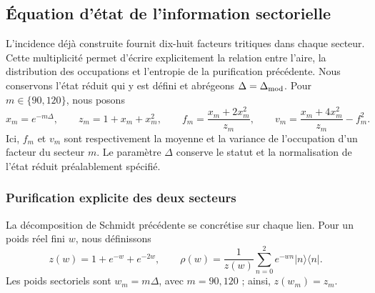 \subsection{Équation d'état de l'information sectorielle}
\label{sec:ii-ecuacion-informacion}

L'incidence déjà construite fournit dix-huit facteurs tritiques dans
chaque secteur. Cette multiplicité permet d'écrire explicitement la
relation entre l'aire, la distribution des occupations et l'entropie de
la purification précédente. Nous conservons l'état réduit qui y est défini
et abrégeons $\Delta=\Delta_{\rm mod}$. Pour $m\in\{90,120\}$, nous posons
\begin{equation}
 x_m=e^{-m\Delta},\qquad z_m=1+x_m+x_m^2,\qquad
 f_m=\frac{x_m+2x_m^2}{z_m},\qquad
 v_m=\frac{x_m+4x_m^2}{z_m}-f_m^2.
 \label{eq:ii-sector-momentos}
\end{equation}
Ici, $f_m$ et $v_m$ sont respectivement la moyenne et la variance de
l'occupation d'un facteur du secteur $m$. Le paramètre $\Delta$ conserve
le statut et la normalisation de l'état réduit préalablement
spécifié.

\subsubsection{Purification explicite des deux secteurs}
\label{sec:ii-area-purificacion-producto}

La décomposition de Schmidt précédente se concrétise sur chaque lien.
Pour un poids réel fini \(w\), nous définissons
\[
 z(w)=1+e^{-w}+e^{-2w},\qquad
 \rho(w)=\frac1{z(w)}\sum_{n=0}^2e^{-wn}|n\rangle\langle n|.
\]
Les poids sectoriels sont \(w_m=m\Delta\), avec \(m=90,120\) ;
ainsi, \(z(w_m)=z_m\).

